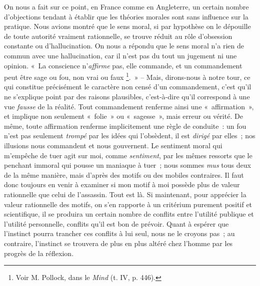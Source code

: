 \documentclass[french,twoside]{book} %
\begin{document}
On nous a fait sur ce point, en France comme en Angleterre, un certain nombre d’objections tendant à établir que les théories morales sont sans influence sur la pratique. Nous avions montré que le sens moral, si par hypothèse on le dépouille de toute autorité vraiment rationnelle, se trouve réduit au rôle d’obsession constante ou d’hallucination. On nous a répondu que le sens moral n’a rien de commun avec une hallucination, car il n’est pas du tout un jugement ni une opinion. « La conscience n’\emph{affirme} pas, elle commande, et un commandement peut être sage ou fou, non vrai ou faux \footnote{Voir M. Pollock, dans le \emph{Mind} (t. IV, p. 446).}. » – Mais, dirons-nous à notre tour, ce qui constitue précisément le caractère non censé d’un commandement, c’est qu’il ne s’explique point par des raisons plausibles, c’est-à-dire qu’il correspond à une vue \emph{fausse} de la réalité. Tout commandement renferme ainsi une « affirmation », et implique non seulement « folie » ou « sagesse », mais erreur ou vérité. De même, toute affirmation renferme implicitement une règle de conduite : un fou n’est pas seulement \emph{trompé} par les idées qui l’obsèdent, il est \emph{dirigé} par elles ; nos illusions nous commandent et nous gouvernent. Le sentiment moral qui m’empêche de tuer agit sur moi, comme \emph{sentiment}, par les mêmes ressorts que le penchant immoral qui pousse un maniaque à tuer ; nous sommes \emph{mus} tous deux de la même manière, mais d’après des motifs ou des mobiles contraires. Il faut donc toujours en venir à examiner si mon motif à moi possède plus de valeur rationnelle que celui de l’assassin. Tout est là. Si maintenant, pour apprécier la valeur rationnelle des motifs, on s’en rapporte à un critérium purement positif et scientifique, il se produira un certain nombre de conflits entre l’utilité publique et l’utilité personnelle, conflits qu’il est bon de prévoir. Quant à espérer que l’instinct pourra trancher ces conflits à lui seul, nous ne le croyons pas ; au contraire, l’instinct se trouvera de plus en plus altéré chez l’homme par les progrès de la réflexion.\par
\end{document}
